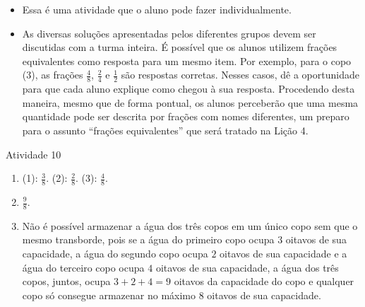 \begin{multicols}{2}
  \vspace{.1cm}

    \vspace{.1cm}

    \begin{itemize} %
    \item       Essa é uma atividade que o aluno pode fazer individualmente.
    \item       As diversas soluções apresentadas pelos diferentes grupos devem ser discutidas com a turma inteira. É possível que os alunos utilizem frações equivalentes como resposta para um mesmo item. Por exemplo, para o copo (3), as frações       $\frac{4}{8}$,       $\frac{2}{4}$ e       $\frac{1}{2}$ são respostas corretas. Nesses casos, dê a oportunidade para que cada aluno explique como chegou à sua resposta. Procedendo desta maneira, mesmo que de forma pontual, os alunos perceberão que uma mesma quantidade pode ser descrita por frações com nomes diferentes, um preparo para o assunto       ``frações equivalentes''     que será tratado na Lição 4.
\end{itemize} %


  \vspace{.1cm}



\begin{resposta*}{Atividade 10}
\begin{enumerate} [\quad a)] %
    \item       (1):       $\frac{3}{8}$. (2):       $\frac{2}{8}$. (3):       $\frac{4}{8}$.
    \item             $\frac{9}{8}$.
    \item       Não é possível armazenar a água dos três copos em um único copo sem que o mesmo transborde, pois se a água do primeiro copo ocupa       $3$ oitavos de sua capacidade, a água do segundo copo ocupa       $2$ oitavos de sua capacidade e a água do terceiro copo ocupa       $4$ oitavos de sua capacidade, a água dos três copos, juntos, ocupa       $3 + 2 + 4 = 9$ oitavos da capacidade do copo e qualquer copo só consegue armazenar  no máximo $8$ oitavos de sua capacidade.
\end{enumerate} %


\end{resposta*}
\end{multicols}
